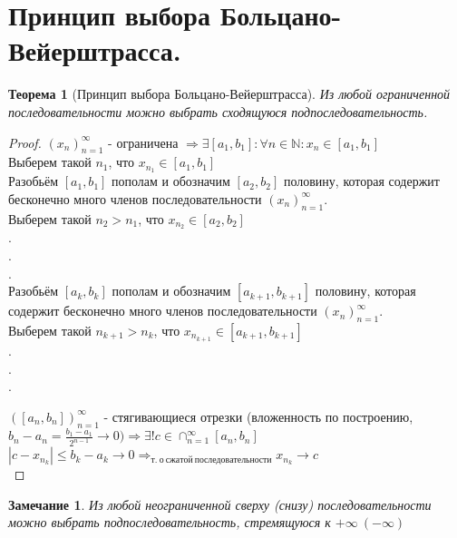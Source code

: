 \documentclass[11pt,a4paper,titlepage]{article}
\newtheorem*{theorem}{Теорема}
\newtheorem*{remark}{Замечание}
\renewcommand{\implies}{\Rightarrow}
\newcommand{\N}{\mathbb{N}}
\begin{document}
    \section{Принцип выбора Больцано-Вейерштрасса.}

    \begin{theorem}[Принцип выбора Больцано-Вейерштрасса]
        Из любой ограниченной последовательности можно выбрать сходящуюся подпоследовательность.
    \end{theorem}

    \begin{proof}
        $(x_n)_{n=1}^\infty$ - ограничена $\implies \exists [a_1, b_1]: \forall n \in \N: x_n \in [a_1, b_1]$\\
        Выберем такой $n_1$, что $x_{n_1} \in [a_1, b_1]$\\
        Разобьём $[a_1, b_1]$ пополам и обозначим $[a_2, b_2]$ половину, которая содержит бесконечно много членов последовательности $(x_n)_{n=1}^\infty$.\\
        Выберем такой $n_2 > n_1$, что $x_{n_2} \in [a_2, b_2]$\\
        .\\
        .\\
        .\\
        Разобьём $[a_k, b_k]$ пополам и обозначим $[a_{k+1}, b_{k+1}]$ половину, которая содержит бесконечно много членов последовательности $(x_n)_{n=1}^\infty$.\\
        Выберем такой $n_{k+1} > n_k$, что $x_{n_{k+1}} \in [a_{k+1}, b_{k+1}]$\\
        .\\
        .\\
        .\\
        \bigskip

        $([a_n, b_n])_{n=1}^\infty$ - стягивающиеся отрезки (вложенность по построению,\\ $b_n - a_n = \frac{b_1-a_1}{2^{n-1}} \to 0) \implies \exists!c \in \cap_{n=1}^\infty[a_n,b_n]$\\
        $|c - x_{n_k}| \leq b_k - a_k \to 0 \implies_{т.\ о\ сжатой\ последовательности} x_{n_k} \to c$\\

    \end{proof}

    \begin{remark}
        Из любой неограниченной сверху (снизу) последовательности можно выбрать подпоследовательность, стремящуюся к $+\infty\ (-\infty)$
    \end{remark}
\end{document}
